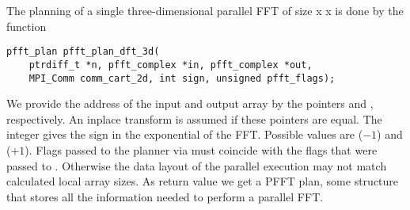 The planning of a single three-dimensional parallel FFT of size  x  x 
is done by the function
\begin{lstlisting}
pfft_plan pfft_plan_dft_3d(
    ptrdiff_t *n, pfft_complex *in, pfft_complex *out,
    MPI_Comm comm_cart_2d, int sign, unsigned pfft_flags);
\end{lstlisting}
We provide the address of the input and output array by the pointers  and ,
respectively. An inplace transform is assumed if these pointers are equal.
The integer  gives the sign in the exponential of the FFT. Possible values are  ($-1$)
and  ($+1$).
Flags passed to the planner via  must coincide with the flags that were passed to .
Otherwise the data layout of the parallel execution may not match calculated local array sizes.
As return value we get a PFFT plan, some structure that stores all the information needed to perform a parallel FFT.

